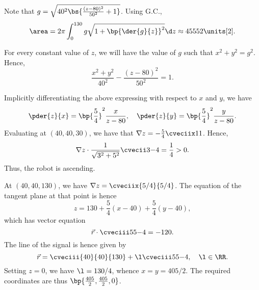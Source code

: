 \begin{solution}
    \begin{ppart}
        Note that $g = \sqrt{40^2 \bs{\frac{(z-80)^2}{50^2} + 1}}$. Using G.C., \[\area = 2\pi \int_0^{130} g \sqrt{1 + \bp{\der{g}{z}}^2} \d z \approx 45552 \units[2].\]
    \end{ppart}
    \begin{ppart}
        For every constant value of $z$, we will have the value of $g$ such that $x^2 + y^2 = g^2$. Hence, \[\frac{x^2+y^2}{40^2} - \frac{(z-80)^2}{50^2} = 1.\]
    \end{ppart}
    \begin{ppart}
        Implicitly differentiating the above expressing with respect to $x$ and $y$, we have \[\pder{z}{x} = \bp{\frac54}^2 \frac{x}{z-80}, \quad \pder{z}{y} = \bp{\frac54}^2 \frac{y}{z-80}.\] Evaluating at $(40, 40, 30)$, we have that $\nabla z = -\frac54 \cveciix11$. Hence, \[\nabla z \cdot \frac1{\sqrt{3^2 + 5^2}} \cvecii3{-4} = \frac14 > 0.\] Thus, the robot is ascending.
    \end{ppart}
    \begin{ppart}
        At $(40, 40, 130)$, we have $\nabla z = \cveciix{5/4}{5/4}$. The equation of the tangent plane at that point is hence \[z = 130 + \frac54(x - 40) + \frac54(y - 40),\] which has vector equation \[\vec r \cdot \cveciii55{-4} = -120.\] The line of the signal is hence given by \[\vec r = \cveciii{40}{40}{130} + \l \cveciii55{-4}, \quad \l \in \RR.\] Setting $z = 0$, we have $\l = 130/4$, whence $x = y = 405/2$. The required coordinates are thus $\bp{\frac{405}2, \frac{405}2, 0}$.
    \end{ppart}
\end{solution}